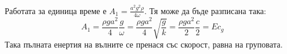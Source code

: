 Работата за единица време е $A_1 = \frac{a^2 g^2 \rho}{4 \omega}$. Тя може да бъде разписана така:
\begin{equation}
	A_1 = \frac{\rho g a^2}{4}\frac{g}{\omega} = \frac{\rho g a^2}{4}\sqrt{\frac{g}{k}}=\frac{\rho g a^2}{2}\frac{c}{2} = E c_g
\end{equation}
Така пълната енертия на вълните се пренася със скорост, равна на груповата.